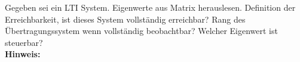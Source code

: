 \begin{question}[section=7,name={LTI-System},difficulty=,type=mdl,tags={}]
	Gegeben sei ein LTI System. Eigenwerte aus Matrix herauslesen. Definition der Erreichbarkeit, ist dieses System vollständig erreichbar? Rang des Übertragungssystem wenn vollständig beobachtbar? Welcher Eigenwert ist steuerbar?
	\\ \textbf{Hinweis:}\\
	
\end{question}
\begin{solution}
	
\end{solution}